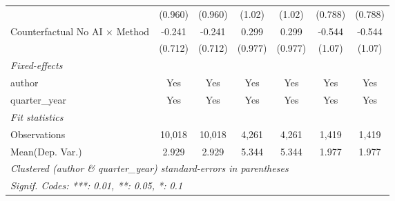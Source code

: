 \begin{tabular}{lcccccc}
                                         & (0.960)       & (0.960)       & (1.02)        & (1.02)        & (0.788)       & (0.788)\\   
   Counterfactual No AI $\times$ Method  & -0.241        & -0.241        & 0.299         & 0.299         & -0.544        & -0.544\\   
                                         & (0.712)       & (0.712)       & (0.977)       & (0.977)       & (1.07)        & (1.07)\\   
   \midrule
   \emph{Fixed-effects}\\
   author                                & Yes           & Yes           & Yes           & Yes           & Yes           & Yes\\  
   quarter\_year                         & Yes           & Yes           & Yes           & Yes           & Yes           & Yes\\  
   \midrule
   \emph{Fit statistics}\\
   Observations                          & 10,018        & 10,018        & 4,261         & 4,261         & 1,419         & 1,419\\  
Mean(Dep. Var.) & 2.929 & 2.929 & 5.344 & 5.344 & 1.977 & 1.977 \\
   \midrule \midrule
   \multicolumn{7}{l}{\emph{Clustered (author \& quarter\_year) standard-errors in parentheses}}\\
   \multicolumn{7}{l}{\emph{Signif. Codes: ***: 0.01, **: 0.05, *: 0.1}}\\
\end{tabular}
\par\endgroup
